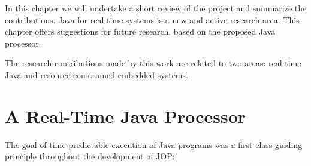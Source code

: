 
In this chapter we will undertake a short review of the project and
summarize the contributions. Java for real-time systems is a new and
active research area. This chapter offers suggestions for future
research, based on the proposed Java processor.

The research contributions made by this work are related to two
areas: real-time Java and resource-constrained embedded systems.

\section{A Real-Time Java Processor}

The goal of time-predictable execution of Java programs was a
first-class guiding principle throughout the development of JOP:


